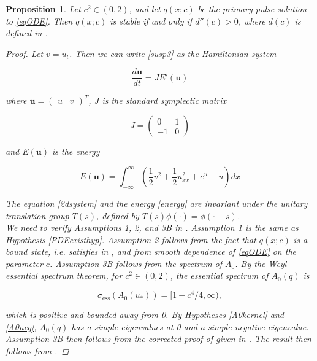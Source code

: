 \documentclass[12pt]{article}
\newtheorem{proposition}{Proposition}
\begin{document}
\begin{proposition}\label{qstable}
Let $c^2 \in (0, 2)$, and let $q(x; c)$ be the primary pulse solution to \eqref{eqODE}. Then $q(x; c)$ is stable if and only if $d''(c) > 0$, where $d(c)$ is defined in \cite[equation (2.16)]{Grillakis1987}.

\begin{proof}
Let $v = u_t$. Then we can write \eqref{susp3} as the Hamiltonian system

\begin{equation}\label{2dsystem}
\frac{d \textbf{u} }{dt} = J E'(\textbf{u})
\end{equation}

where $\textbf{u} = \begin{pmatrix}u&v\end{pmatrix}^T$, $J$ is the standard symplectic matrix

\begin{equation*}
J = \begin{pmatrix}0 & 1 \\ -1 & 0 \end{pmatrix}
\end{equation*}

and $E(\textbf{u})$ is the energy

\begin{equation}\label{energy}
E(\textbf{u}) = \int_{-\infty}^\infty \left(\frac{1}{2} v^2 + \frac{1}{2}u_{xx}^2 + e^{u} - u \right)dx
\end{equation}

The equation \eqref{2dsystem} and the energy \eqref{energy} are invariant under the unitary translation group $T(s)$, defined by $T(s)\phi(\cdot) = \phi(\cdot - s)$. \\

We need to verify Assumptions 1, 2, and 3B in \cite{Grillakis1987}. Assumption 1 is the same as Hypothesis \ref{PDEexisthyp}. Assumption 2 follows from the fact that $q(x; c)$ is a bound state, i.e. satisfies in \cite[equation (2.15)]{Grillakis1987}, and from smooth dependence of \eqref{eqODE} on the parameter $c$. Assumption 3B follows from the spectrum of $A_0$. By the Weyl essential spectrum theorem, for $c^2 \in (0, 2)$, the essential spectrum of $A_0(q)$ is 

\begin{equation}\label{A0ess}
\sigma_{\text{ess}}(A_0(u_*)) = [1 - c^4/4, \infty),
\end{equation}

which is positive and bounded away from 0. By Hypotheses \ref{A0kernel} and \ref{A0neg}, $A_0(q)$ has a simple eigenvalues at 0 and a simple negative eigenvalue. Assumption 3B then follows from the corrected proof of \cite[Lemma 6.2]{Grillakis1987} given in \cite{Grillakis1990}. The result then follows from \cite[Theorem 5.5 and 3]{Grillakis1987}.
\end{proof}
\end{proposition}
\end{document}
